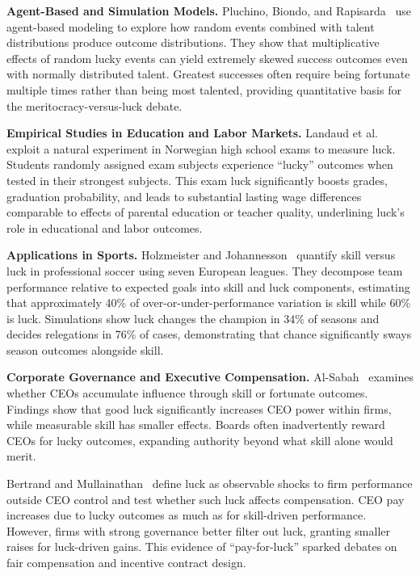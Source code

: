   \textbf{Agent-Based and Simulation Models.}
  Pluchino, Biondo, and Rapisarda~\cite{pluchino2018} use agent-based
  modeling to explore how random events combined with talent distributions
  produce outcome distributions. They show that multiplicative effects
  of random lucky events can yield extremely skewed success outcomes even
  with normally distributed talent. Greatest successes often require being
  fortunate multiple times rather than being most talented, providing
  quantitative basis for the meritocracy-versus-luck debate.

  \textbf{Empirical Studies in Education and Labor Markets.}
  Landaud et al.~\cite{landaud2022} exploit a natural experiment in Norwegian
  high school exams to measure luck. Students randomly assigned exam subjects
  experience ``lucky'' outcomes when tested in their strongest subjects.
  This exam luck significantly boosts grades, graduation probability, and
  leads to substantial lasting wage differences comparable to effects of
  parental education or teacher quality, underlining luck's role in educational
  and labor outcomes.

  \textbf{Applications in Sports.}
  Holzmeister and Johannesson~\cite{holzmeister2025} quantify skill versus
  luck in professional soccer using seven European leagues. They decompose
  team performance relative to expected goals into skill and luck components,
  estimating that approximately 40\% of over-or-under-performance variation
  is skill while 60\% is luck. Simulations show luck changes the champion
  in 34\% of seasons and decides relegations in 76\% of cases, demonstrating
  that chance significantly sways season outcomes alongside skill.

  \textbf{Corporate Governance and Executive Compensation.}
  Al-Sabah~\cite{alsabah2020} examines whether CEOs accumulate influence
  through skill or fortunate outcomes. Findings show that good luck significantly
  increases CEO power within firms, while measurable skill has smaller effects.
  Boards often inadvertently reward CEOs for lucky outcomes, expanding
  authority beyond what skill alone would merit.

  Bertrand and Mullainathan~\cite{bertrand2001} define luck as observable
  shocks to firm performance outside CEO control and test whether such
  luck affects compensation. CEO pay increases due to lucky outcomes as
  much as for skill-driven performance. However, firms with strong governance
  better filter out luck, granting smaller raises for luck-driven gains.
  This evidence of ``pay-for-luck'' sparked debates on fair compensation
  and incentive contract design.

